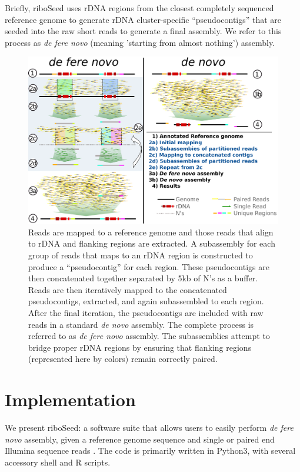 \documentclass[10pt]{article}
\begin{document}
\begin{linenumbers}
Briefly, riboSeed uses rDNA regions from the closest completely sequenced reference genome to generate rDNA cluster-specific ``pseudocontigs'' that are seeded into the raw short reads to generate a final assembly. We refer to this process as \textit{de fere novo} (meaning 'starting from almost nothing') assembly.


\begin{figure}[!h]
  \centering
  \includegraphics[width=.8\textwidth]{riboSeed_v11}
  \caption{Reads are mapped to a reference genome and those reads that align to rDNA and flanking regions are extracted. A subassembly for each group of reads that maps to an rDNA region is constructed to produce a ``pseudocontig'' for each region. These pseudocontigs are then concatenated together separated by 5kb of N’s as a buffer. Reads are then iteratively mapped to the concatenated pseudocontigs, extracted, and again subassembled to each region. After the final iteration, the pseudocontigs are included with raw reads in a standard \textit{de novo} assembly. The complete process is referred to as \textit{de fere novo} assembly. The subassemblies attempt to bridge proper rDNA regions by ensuring that flanking regions (represented here by colors) remain correctly paired.
  }
  \label{fig:overview}
\end{figure}




\section*{Implementation}
We present riboSeed: a software suite that allows users to easily perform \textit{de fere novo} assembly, given a reference genome sequence and single or paired end Illumina sequence reads . The code is primarily written in Python3, with several accessory shell and R scripts.



\end{linenumbers}
\end{document}
